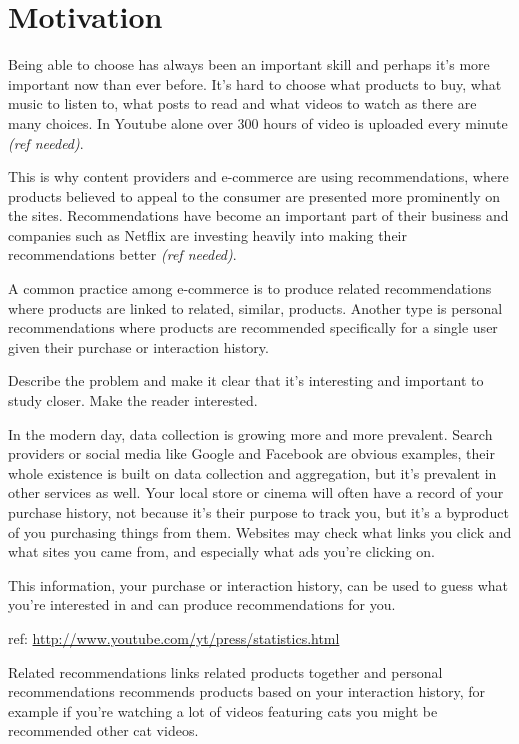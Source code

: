 
\section{Motivation}\label{sec:intro:motivation}

Being able to choose has always been an important skill and perhaps it's more important now than ever before. It's hard to choose what products to buy, what music to listen to, what posts to read and what videos to watch as there are many choices. In Youtube alone over 300 hours of video is uploaded every minute \textit{(ref needed)}.

This is why content providers and e-commerce are using recommendations, where products believed to appeal to the consumer are presented more prominently on the sites. Recommendations have become an important part of their business and companies such as Netflix are investing heavily into making their recommendations better \textit{(ref needed)}.

A common practice among e-commerce is to produce related recommendations where products are linked to related, similar, products. Another type is personal recommendations where products are recommended specifically for a single user given their purchase or interaction history.

\vspace{1cm}

Describe the problem and make it clear that it's interesting and important to study closer. Make the reader interested.

In the modern day, data collection is growing more and more prevalent. Search providers or social media like Google and Facebook are obvious examples, their whole existence is built on data collection and aggregation, but it's prevalent in other services as well. Your local store or cinema will often have a record of your purchase history, not because it's their purpose to track you, but it's a byproduct of you purchasing things from them. Websites may check what links you click and what sites you came from, and especially what ads you're clicking on.

This information, your purchase or interaction history, can be used to guess what you're interested in and can produce recommendations for you.

ref: \url{http://www.youtube.com/yt/press/statistics.html}

Related recommendations links related products together and personal recommendations recommends products based on your interaction history, for example if you're watching a lot of videos featuring cats you might be recommended other cat videos.
